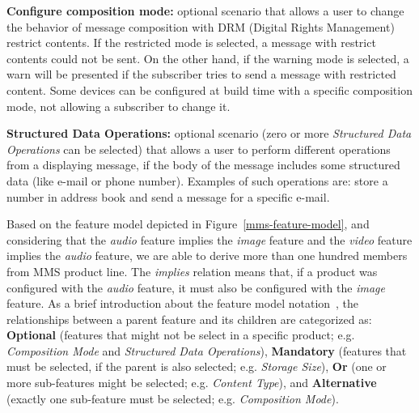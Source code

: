 \documentclass{acm_proc_article-sp}
\begin{document}


{\bf Configure composition mode:} optional scenario that allows a user to change the behavior of message composition with DRM (Digital Rights Management) restrict contents. If the restricted mode is selected, a message with restrict contents could not be sent. On the other hand, if the warning mode is selected, a warn will be presented if the subscriber tries to send a message with restricted content. Some devices can be configured at build time with a specific composition mode, not allowing a subscriber to change it. 

{\bf Structured Data Operations:} optional scenario (zero or more \emph{Structured Data Operations} can be selected) that allows a user to perform different operations from a displaying message, if the body of the message includes some structured data (like e-mail or phone number). Examples of such operations are: store a number in address book and send a message for a specific e-mail.

Based on the feature model depicted in Figure~\ref{mms-feature-model}, and considering that the \emph{audio} feature implies the \emph{image} feature and the \emph{video} feature implies the \emph{audio} feature, we are able to derive more than one hundred members from MMS product line. The \emph{implies} relation means that, if a product was configured with the \emph{audio} feature, it must also be configured with the \emph{image} feature. As a brief introduction about the feature model notation~\cite{czarnecki-book,gheyi-alloy-06}, the relationships between a parent feature and its children are categorized as: {\bf Optional} (features that might not be select in a specific product; e.g. \emph{Composition Mode} and \emph{Structured Data Operations}), {\bf Mandatory} (features that must be selected, if the parent is also selected; e.g. \emph{Storage Size}), {\bf Or} (one or more sub-features might be selected; e.g. \emph{Content Type}), and {\bf Alternative} (exactly one sub-feature must be selected; e.g. \emph{Composition Mode}).
\end{document}
